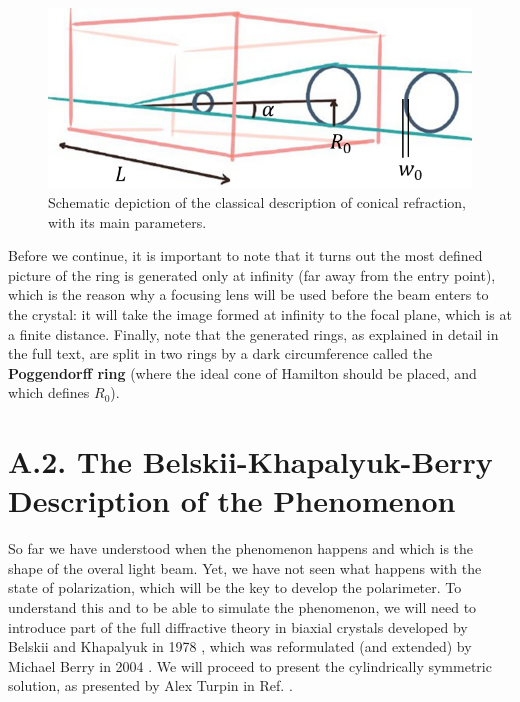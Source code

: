 \documentclass[11pt, a4paper, twoside]{article} %
\begin{document}
\begin{figure}[h!] 
     \centering 
         \includegraphics[width=0.5\linewidth]{cr.PNG}
    \caption{Schematic depiction of the classical description of conical refraction, with its main parameters.}
    \label{fig:CR}
\end{figure}
Before we continue, it is important to note that it turns out the most defined picture of the ring is generated only at infinity (far away from the entry point), which is the reason why a focusing lens will be used before the beam enters to the crystal: it will take the image formed at infinity to the focal plane, which is at a finite distance. Finally, note that the generated rings, as explained in detail in the full text, are split in two rings by a dark circumference called the {\bf Poggendorff ring} (where the ideal cone of Hamilton should be placed, and which defines $R_0$).


\section*{A.2. The Belskii-Khapalyuk-Berry Description of the Phenomenon }

So far we have understood when the phenomenon happens and which is the shape of the overal light beam. Yet, we have not seen what happens with the state of polarization, which will be the key to develop the polarimeter. To understand this and to be able to simulate the phenomenon, we will need to introduce part of the full diffractive theory in biaxial crystals developed by Belskii and Khapalyuk in 1978 \cite{BK1,BK2}, which was reformulated (and extended) by Michael Berry in 2004 \cite{Berry}. We will proceed to present the cylindrically symmetric solution, as presented by Alex Turpin in Ref. \cite{Turpin}.\vspace{-0.1cm}
\end{document}
